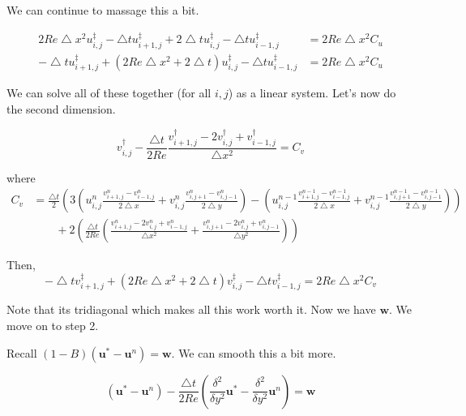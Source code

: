 \documentclass[12pt]{article}
\begin{document}
We can continue to massage this a bit.

\begin{align*}
    2 Re \bigtriangleup x^2 u^\ddagger_{i,j} - \bigtriangleup t u^\ddagger_{i+1,j} + 2\bigtriangleup t u^\ddagger_{i,j} - \bigtriangleup t u^\ddagger_{i-1,j} &= 2 Re \bigtriangleup x^2 C_u \\
    - \bigtriangleup tu^\ddagger_{i+1,j} + (2 Re \bigtriangleup x^2 + 2\bigtriangleup t)u^\ddagger_{i,j} - \bigtriangleup t u^\ddagger_{i-1,j} &= 2 Re \bigtriangleup x^2 C_u
\end{align*}

We can solve all of these together (for all $i,j$) as a linear system. Let's now do the second dimension.

\begin{equation}
    v^\dagger_{i,j} - \frac{\bigtriangleup t}{2 Re} \frac{v^\dagger_{i+1,j} - 2v^\dagger_{i,j} + v^\dagger_{i-1,j}}{\bigtriangleup x^2} = C_v
\end{equation}

where
\begin{align*}
    C_v &= \frac{\bigtriangleup t}{2}(3(u^n_{i,j}\frac{v^n_{i+1,j} - v^n_{i-1,j}}{2\bigtriangleup x} + v^n_{i,j}\frac{v^n_{i,j+1} - v^n_{i,j-1}}{2\bigtriangleup y}) - (u^{n-1}_{i,j}\frac{v^{n-1}_{i+1,j} - v^{n-1}_{i-1,j}}{2\bigtriangleup x} + v^{n-1}_{i,j}\frac{v^{n-1}_{i,j+1} - v^{n-1}_{i,j-1}}{2\bigtriangleup y})) \\
    & \qquad + 2(\frac{\bigtriangleup t}{2 Re}(\frac{v^n_{i+1,j} -2v^n_{i,j} + v^n_{i-1,j}}{\bigtriangleup x^2} + \frac{v^n_{i,j+1} -2v^n_{i,j} + v^n_{i,j-1}}{\bigtriangleup y^2}))
\end{align*}

Then,
\begin{equation}
    - \bigtriangleup t v^\ddagger_{i+1,j} + (2Re \bigtriangleup x^2 + 2\bigtriangleup t)v^\ddagger_{i,j} - \bigtriangleup t v^\ddagger_{i-1,j} = 2 Re \bigtriangleup x^2 C_v
\end{equation}

Note that its tridiagonal which makes all this work worth it. Now we have $\mathbf{w}$. We move on to step 2.

Recall $(1 - B)(\mathbf{u}^* - \mathbf{u}^n) = \mathbf{w}$. We can smooth this a bit more.

\begin{equation}
    (\mathbf{u}^* - \mathbf{u}^n) - \frac{\bigtriangleup t}{2 Re}(\frac{\delta^2}{\delta y^2} \mathbf{u}^* - \frac{\delta^2}{\delta y^2} \mathbf{u}^n) = \mathbf{w}
\end{equation}
\end{document}
